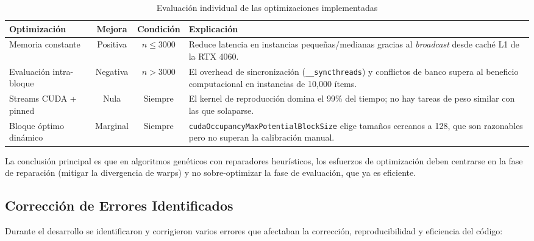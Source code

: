 \begin{table}[H]
  \centering
  \caption{Evaluación individual de las optimizaciones implementadas}
  \label{tab:optimizaciones}
  \begin{tabular}{lccp{6cm}}
    \toprule
    \textbf{Optimización} & \textbf{Mejora} & \textbf{Condición} &
    \textbf{Explicación} \\
    \midrule
    Memoria constante & Positiva & $n \leq 3000$ &
      Reduce latencia en instancias pequeñas/medianas gracias al \emph{broadcast} desde caché L1 de la RTX 4060. \\
    Evaluación intra-bloque & Negativa & $n > 3000$ &
      El overhead de sincronización (\texttt{\_\_syncthreads}) y conflictos de banco supera al beneficio computacional en instancias de 10,000 ítems. \\
    Streams CUDA + pinned & Nula & Siempre &
      El kernel de reproducción domina el 99\% del tiempo; no hay tareas de peso similar con las que solaparse. \\
    Bloque óptimo dinámico & Marginal & Siempre &
      \texttt{cudaOccupancyMaxPotentialBlockSize} elige tamaños cercanos a 128, que son razonables pero no superan la calibración manual. \\
    \bottomrule
  \end{tabular}
\end{table}

La conclusión principal es que en algoritmos genéticos con reparadores heurísticos, los esfuerzos de optimización deben centrarse en la fase de reparación (mitigar la divergencia de warps) y no sobre-optimizar la fase de evaluación, que ya es eficiente.

\subsection{Corrección de Errores Identificados}

Durante el desarrollo se identificaron y corrigieron varios errores que afectaban
la corrección, reproducibilidad y eficiencia del código:

